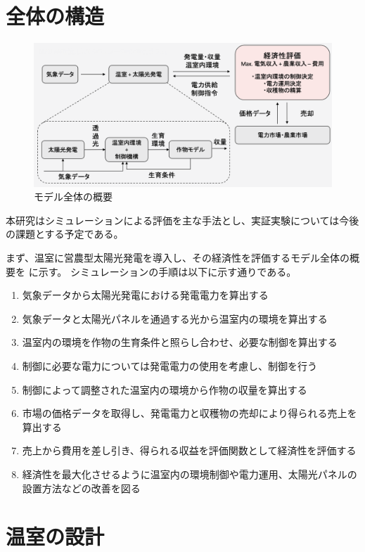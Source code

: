 \documentclass[uplatex,dvipdfmx,nomag,a4paper,oneside,onecolumn,12pt]{bxjsreport} %
\begin{document}
\section{全体の構造}

\begin{figure}[ht]
    \centering
    \includegraphics[width=0.9\linewidth]{fig/wholeSystem.png}
    \caption{モデル全体の概要}
    \label{fig:wholeSystem}
\end{figure}

本研究はシミュレーションによる評価を主な手法とし、実証実験については今後の課題とする予定である。

まず、温室に営農型太陽光発電を導入し、その経済性を評価するモデル全体の概要を  に示す。
シミュレーションの手順は以下に示す通りである。

\begin{enumerate}
    \item 気象データから太陽光発電における発電電力を算出する
    \item 気象データと太陽光パネルを通過する光から温室内の環境を算出する
    \item 温室内の環境を作物の生育条件と照らし合わせ、必要な制御を算出する
    \item 制御に必要な電力については発電電力の使用を考慮し、制御を行う
    \item 制御によって調整された温室内の環境から作物の収量を算出する
    \item 市場の価格データを取得し、発電電力と収穫物の売却により得られる売上を算出する
    \item 売上から費用を差し引き、得られる収益を評価関数として経済性を評価する
    \item 経済性を最大化させるように温室内の環境制御や電力運用、太陽光パネルの設置方法などの改善を図る
\end{enumerate}


\section{温室の設計}
\end{document}
